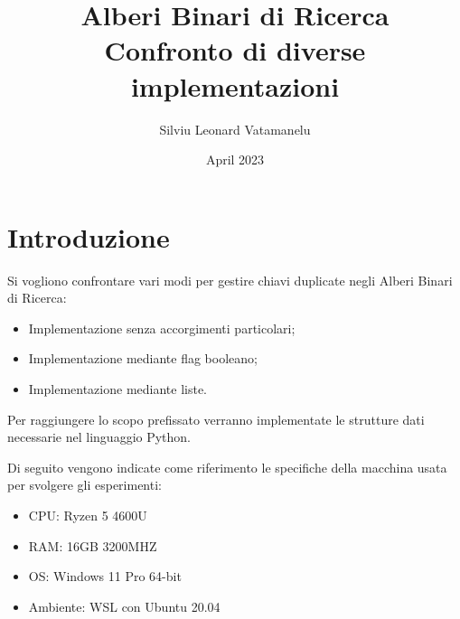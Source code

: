 \documentclass{article}
\title{Alberi Binari di Ricerca \\
\large Confronto di diverse implementazioni
}
\author{Silviu Leonard Vatamanelu}
\date{April 2023}
\begin{document}
\maketitle
\tableofcontents
\newpage
\section{Introduzione}
Si vogliono confrontare vari modi per gestire chiavi duplicate negli Alberi Binari di Ricerca:
\begin{itemize}
    \item Implementazione senza accorgimenti particolari;
    \item Implementazione mediante flag booleano;
    \item Implementazione mediante liste.
\end{itemize}
Per raggiungere lo scopo prefissato verranno implementate le strutture dati necessarie nel linguaggio Python.

Di seguito vengono indicate come riferimento le specifiche della macchina usata per svolgere gli esperimenti:
\begin{itemize}
    \item CPU: Ryzen 5 4600U
    \item RAM: 16GB 3200MHZ
    \item OS: Windows 11 Pro 64-bit
    \item Ambiente: WSL con Ubuntu 20.04
\end{itemize}
\end{document}
